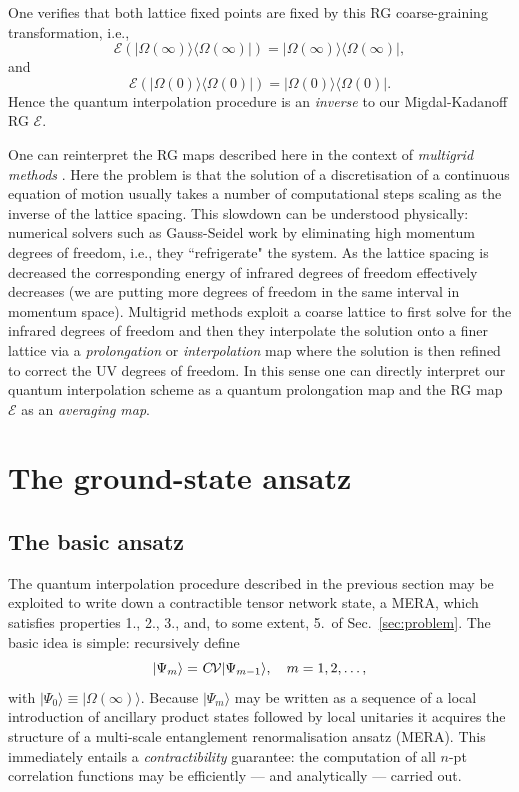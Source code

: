 \documentclass[twocolumn,lengthcheck,superscriptaddress]{revtex4-1}
\theoremstyle{definition}
\theoremstyle{remark}
\begin{document}
One verifies that both lattice fixed points are fixed by this RG coarse-graining transformation, i.e.,
\begin{equation}
	\mathcal{E}(|\Omega(\infty)\rangle\langle\Omega(\infty)|) = |\Omega(\infty)\rangle\langle\Omega(\infty)|,
\end{equation}
and
\begin{equation}
	\mathcal{E}(|\Omega(0)\rangle\langle\Omega(0)|) = |\Omega(0)\rangle\langle\Omega(0)|.
\end{equation}
Hence the quantum interpolation procedure is an \emph{inverse} to our Migdal-Kadanoff RG $\mathcal{E}$.

One can reinterpret the RG maps described here in the context of \emph{multigrid methods} \cite{wesseling:2004a}. Here the problem is that the solution of a discretisation of a continuous equation of motion usually takes a number of computational steps scaling as the inverse of the lattice spacing. This slowdown can be understood physically: numerical solvers such as Gauss-Seidel work by eliminating high momentum degrees of freedom, i.e., they ``refrigerate" the system. As the lattice spacing is decreased the corresponding energy of infrared degrees of freedom effectively decreases (we are putting more degrees of freedom in the same interval in momentum space). Multigrid methods exploit a coarse lattice to first solve for the infrared degrees of freedom and then they interpolate the solution onto a finer lattice via a \emph{prolongation} or \emph{interpolation} map where the solution is then refined to correct the UV degrees of freedom. In this sense one can directly interpret our quantum interpolation scheme as a quantum prolongation map and the RG map $\mathcal{E}$ as an \emph{averaging map}.
 

\section{The ground-state ansatz}

\subsection{The basic ansatz}
The quantum interpolation procedure described in the previous section may be exploited to write down a contractible tensor network state, a MERA, which satisfies properties 1., 2., 3., and, to some extent, 5.\ of Sec.~\ref{sec:problem}. The basic idea is simple: recursively define
\begin{equation}\label{eq:basicansatz}
	|\Psi_m\rangle = \textsl{C}\mathcal{V}|\Psi_{m-1}\rangle, \quad m = 1, 2, \ldots,
\end{equation}
with $|\Psi_0\rangle \equiv |\Omega(\infty)\rangle$. Because $|\Psi_m\rangle$ may be written as a sequence of a local introduction of ancillary product states followed by local unitaries it acquires the structure of a multi-scale entanglement renormalisation ansatz (MERA). This immediately entails a \emph{contractibility} guarantee: the computation of all $n$-pt correlation functions may be efficiently --- and analytically --- carried out. 
\end{document}
